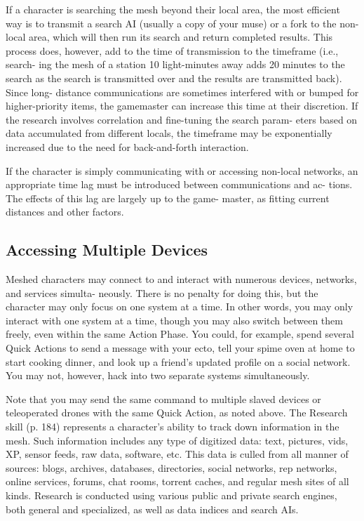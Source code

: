 If a character is searching the mesh beyond their 
local area, the most efficient way is to transmit a search 
AI (usually a copy of your muse) or a fork to the non-
local area, which will then run its search and return 
completed results. This process does, however, add to 
the time of transmission to the timeframe (i.e., search-
ing the mesh of a station 10 light-minutes away adds 
20 minutes to the search as the search is transmitted 
over and the results are transmitted back). Since long-
distance communications are sometimes interfered with 
or bumped for higher-priority items, the gamemaster 
can increase this time at their discretion. If the research 
involves correlation and fine-tuning the search param-
eters based on data accumulated from different locals, 
the timeframe may be exponentially increased due to 
the need for back-and-forth interaction.

If the character is simply communicating with or 
accessing non-local networks, an appropriate time lag 
must be introduced between communications and ac-
tions. The effects of this lag are largely up to the game-
master, as fitting current distances and other factors.

\subsection{Accessing Multiple Devices}

Meshed characters may connect to and interact with 
numerous devices, networks, and services simulta-
neously. There is no penalty for doing this, but the 
character may only focus on one system at a time. In 
other words, you may only interact with one system 
at a time, though you may also switch between them 
freely, even within the same Action Phase. You could, 
for example, spend several Quick Actions to send a 
message with your ecto, tell your spime oven at home 
to start cooking dinner, and look up a friend's updated 
profile on a social network. You may not, however, 
hack into two separate systems simultaneously.

Note that you may send the same command to 
multiple slaved devices or teleoperated drones with 
the same Quick Action, as noted above.
The Research skill (p. 184) represents a character's 
ability to track down information in the mesh. Such 
information includes any type of digitized data: text, 
pictures, vids, XP, sensor feeds, raw data, software, etc. 
This data is culled from all manner of sources: blogs, 
archives, databases, directories, social networks, rep 
networks, online services, forums, chat rooms, torrent 
caches, and regular mesh sites of all kinds. Research 
is conducted using various public and private search 
engines, both general and specialized, as well as data 
indices and search AIs.

